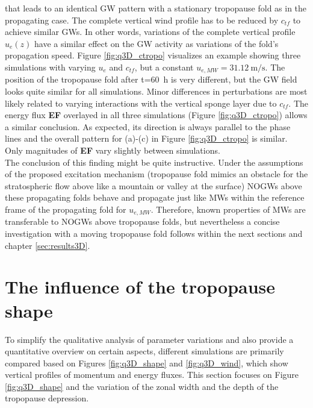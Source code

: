 that leads to an identical GW pattern with a stationary tropopause fold as in the propagating case. The complete vertical wind profile has to be reduced by $c_{tf}$ to achieve similar GWs. In other words, variations of the complete vertical profile $u_e(z)$ have a similar effect on the GW activity as variations of the fold's propagation speed. Figure \ref{fig:q3D_ctropo} visualizes an example showing three simulations with varying $u_e$ and $c_{tf}$, but a constant $u_{e,MW}=\SI{31.12}{\meter\per\second}$. The position of the tropopause fold after t=\SI{60}{\hour} is very different, but the GW field looks quite similar for all simulations. Minor differences in perturbations are most likely related to varying interactions with the vertical sponge layer due to $c_{tf}$. The energy flux \textbf{EF} overlayed in all three simulations (Figure \ref{fig:q3D_ctropo}) allows a similar conclusion. As expected, its direction is always parallel to the phase lines and the overall pattern for (a)-(c) in Figure \ref{fig:q3D_ctropo} is similar. Only magnitudes of \textbf{EF} vary slightly between simulations. \\
The conclusion of this finding might be quite instructive. Under the assumptions of the proposed excitation mechanism (tropopause fold mimics an obstacle for the stratospheric flow above like a mountain or valley at the surface) NOGWs above these propagating folds behave and propagate just like MWs within the reference frame of the propagating fold for $u_{e,MW}$. Therefore, known properties of MWs are transferable to NOGWs above tropopause folds, but nevertheless a concise investigation with a moving tropopause fold follows within the next sections and chapter \ref{sec:results3D}.
%
\section{The influence of the tropopause shape}
\label{sec:q3D-shape}
To simplify the qualitative analysis of parameter variations and also provide a quantitative overview on certain aspects, different simulations are primarily compared based on Figures \ref{fig:q3D_shape} and \ref{fig:q3D_wind}, which show vertical profiles of momentum and energy fluxes. This section focuses on Figure \ref{fig:q3D_shape} and the variation of the zonal width and the depth of the tropopause depression.

